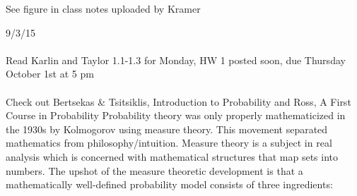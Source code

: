 \documentclass[12pt]{article}
\numberwithin{equation}{section}
\begin{document}
See figure in class notes uploaded by Kramer

\pagebreak

9/3/15\\
\\
Read Karlin and Taylor 1.1-1.3 for Monday, HW 1 posted soon, due Thursday October 1st at 5 pm\\
\\
Check out Bertsekas \& Tsitsiklis, Introduction to Probability and Ross, A First Course in Probability
Probability theory was only properly mathematicized in the 1930s by Kolmogorov using measure theory. This movement separated mathematics from philosophy/intuition. Measure theory is a subject in real analysis which is concerned with mathematical structures that map sets into numbers. The upshot of the measure theoretic development is that a mathematically well-defined probability model consists of three ingredients:
\end{document}
